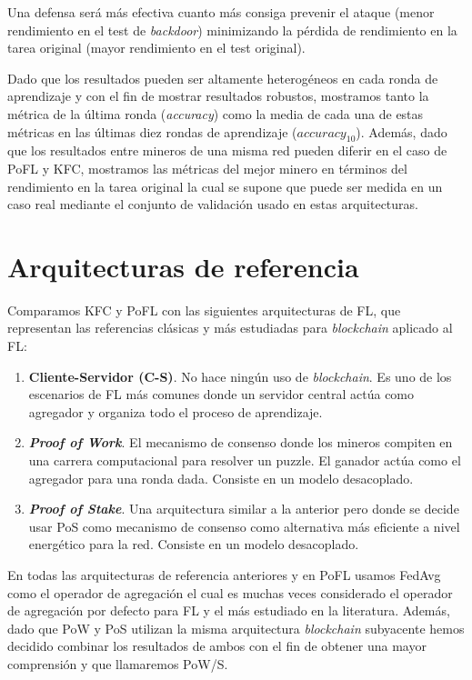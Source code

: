 Una defensa será más efectiva cuanto más consiga prevenir el ataque (menor rendimiento en el test de \textit{backdoor}) minimizando la pérdida de rendimiento en la tarea original (mayor rendimiento en el test original).

Dado que los resultados pueden ser altamente heterogéneos en cada ronda de aprendizaje y con el fin de mostrar resultados robustos, mostramos tanto la métrica de la última ronda (\textit{accuracy}) como la media de cada una de estas métricas en las últimas diez rondas de aprendizaje ($accuracy_{10}$). Además, dado que los resultados entre mineros de una misma red pueden diferir en el caso de \ac{PoFL} y \ac{KFC}, mostramos las métricas del mejor minero en términos del rendimiento en la tarea original la cual se supone que puede ser medida en un caso real mediante el conjunto de validación usado en estas arquitecturas.

\section{Arquitecturas de referencia}
Comparamos \ac{KFC} y \ac{PoFL} con las siguientes arquitecturas de \ac{FL}, que representan las referencias clásicas y más estudiadas para \textit{blockchain} aplicado al \ac{FL}:
\begin{enumerate}
    \item \textbf{Cliente-Servidor (C-S)}. No hace ningún uso de \textit{blockchain}. Es uno de los escenarios de \ac{FL} más comunes donde un servidor central actúa como agregador y organiza todo el proceso de aprendizaje.
    \item \textbf{\textit{Proof of Work}}. El mecanismo de consenso donde los mineros compiten en una carrera computacional para resolver un puzzle. El ganador actúa como el agregador para una ronda dada. Consiste en un modelo desacoplado.
    \item \textbf{\textit{Proof of Stake}}. Una arquitectura similar a la anterior pero donde se decide usar \ac{PoS} como mecanismo de consenso como alternativa más eficiente a nivel energético para la red. Consiste en un modelo desacoplado.
\end{enumerate}

En todas las arquitecturas de referencia anteriores y en \ac{PoFL} usamos \ac{FedAvg}~\cite{mcmahan-2023} como el operador de agregación el cual es muchas veces considerado el operador de agregación por defecto para \ac{FL} y el más estudiado en la literatura. Además, dado que \ac{PoW} y \ac{PoS} utilizan la misma arquitectura \textit{blockchain} subyacente hemos decidido combinar los resultados de ambos con el fin de obtener una mayor comprensión y que llamaremos PoW/S.

